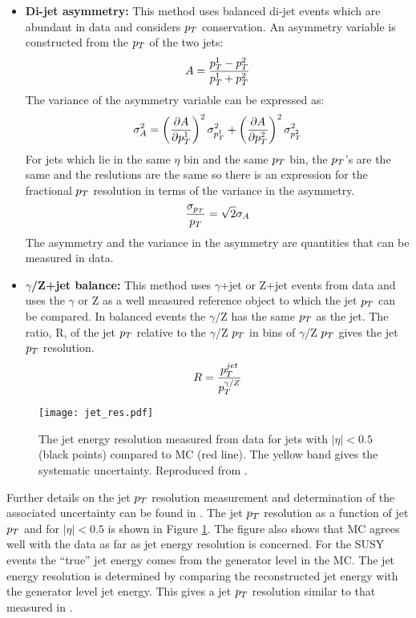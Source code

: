 \begin{itemize}
\item {\bf Di-jet asymmetry:} This method uses balanced di-jet events which are 
abundant in data and considers $p_{T}$ conservation. An asymmetry variable is 
constructed from the $p_{T}$ of the two jets:
\begin{equation}
A = \frac{p_{T}^{1} - p_{T}^{2}}{p_{T}^{1} + p_{T}^{2}}
\end{equation}
The variance of the asymmetry variable can be expressed as:
\begin{equation}
\sigma_{A}^{2} = \left(\frac{\partial A}{\partial
p_{T}^{1}}\right)^{2}\sigma_{p_{T}^{1}}^{2} + \left(\frac{\partial A}{\partial
p_{T}^{2}}\right)^{2}\sigma_{p_{T}^{2}}^{2}
\end{equation}
For jets which lie in the same $\eta$ bin and the same $p_{T}$ bin, the $p_{T}$'s
are the same and the reslutions are the same so there is an expression for the
fractional $p_{T}$ resolution in terms of the variance in the asymmetry.
\begin{equation}
\frac{\sigma_{p_{T}}}{p_{T}} = \sqrt{2}\sigma_{A}
\end{equation}  
The asymmetry and the variance in the asymmetry are quantities that can be 
measured in data.
\item {\bf $\gamma$/Z+jet balance:} This method uses $\gamma$+jet or Z+jet
events from data and uses the $\gamma$ or Z as a well measured reference object
to which the jet $p_{T}$ can be compared. In balanced events the $\gamma$/Z has 
the same $p_{T}$ as the jet. The ratio, R, of the jet $p_{T}$ relative to the 
$\gamma$/Z $p_{T}$ in bins of $\gamma$/Z $p_{T}$ gives the jet $p_{T}$ resolution. 
\begin{equation}
R = \frac{p_{T}^{jet}}{p_{T}^{\gamma/Z}}
\end{equation}
\end{itemize}

\begin{figure}
\begin{center}
\texttt{[image: jet\_res.pdf]}
\end{center}
\caption{The jet energy resolution measured from data for jets with $|\eta| <
0.5$ (black points) compared to MC (red line). The yellow band gives the
systematic uncertainty. Reproduced from \cite{jec}.}
\label{fig:jet_res}
\end{figure}

Further details on the jet $p_{T}$ resolution measurement and determination of the
associated uncertainty can be found in \cite{jec}. The jet $p_{T}$ resolution as a
function of jet $p_{T}$ and for $|\eta| < 0.5$ is shown in Figure
\ref{fig:jet_res}. The figure also shows that MC agrees well with the
data as far as jet energy resolution is concerned. For the SUSY events the 
``true'' jet energy comes from the generator level in the MC. The jet energy 
resolution is determined by comparing the reconstructed jet energy with the 
generator level jet energy. This gives a jet $p_{T}$ resolution similar to that 
measured in \cite{jec}. \\

